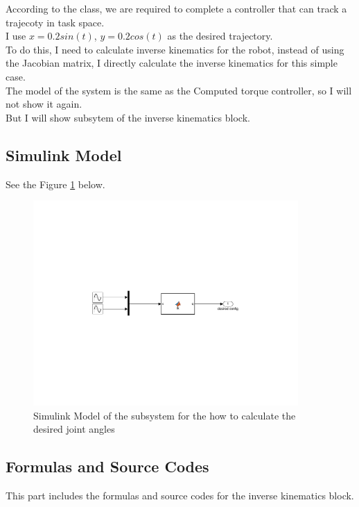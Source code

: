 \documentclass{article}
\begin{document}
According to the class, we are required to complete a controller that can track a trajecoty in task space.\\

I use $x = 0.2 sin(t)$, $y = 0.2 cos(t)$ as the desired trajectory.\\

To do this, I need to calculate inverse kinematics for the robot, instead of using the Jacobian matrix, I directly calculate the inverse kinematics for this simple case.\\

The model of the system is the same as the Computed torque controller, so I will not show it again.\\ But I will show subsytem of the inverse kinematics block.\\

\subsection{Simulink Model}

See the Figure \ref{fig:model_ik} below.
\begin{figure}[ht]
    \centering
    \includegraphics[width=0.9\textwidth]{figures/desiredTaskSpaceIKModel.pdf}
    \caption{Simulink Model of the subsystem for the how to calculate the desired joint angles}
    \label{fig:model_ik}
\end{figure}



\subsection{Formulas and Source Codes}
This part includes the formulas and source codes for the inverse kinematics block.
\end{document}
